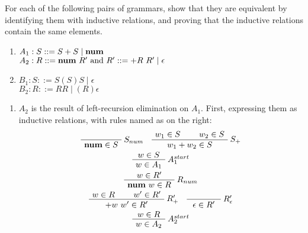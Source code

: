 
\begin{exercise}{}
  For each of the following pairs of grammars, show that they are equivalent by
  identifying them with inductive relations, and proving that the inductive
  relations contain the same elements.

  \begin{enumerate}
    \item 
    \(A_1 : S ::= S + S \mid \mathbf{num} \) \\ 
    \(A_2 : R ::= \mathbf{num} ~R' \text{ and } R' ::= + R~ R' \mid \epsilon\)
    \item 
    \(B_1 : S ::= S(S)S \mid \epsilon \) \\ 
    \(B_2 : R ::= RR \mid (R) \epsilon\)
  \end{enumerate}

  \begin{solution}
    \begin{enumerate}
      \item \(A_2\) is the result of left-recursion elimination on \(A_1\).
      First, expressing them as inductive relations, with rules named as on the
      right:
      \addtolength{\jot}{1ex}
      \begin{gather*}
        \AxiomC{\phantom{\(w_1 \in S\)}}
        \RightLabel{\(S_{num}\)}
        \UnaryInfC{\(\num \in S\)}
        \DisplayProof 
        \quad
        \AxiomC{\(w_1 \in S\)}
        \AxiomC{\(w_2 \in S\)}
        \RightLabel{\(S_+\)}
        \BinaryInfC{\(w_1 + w_2 \in S\)}
        \DisplayProof \\
        \AxiomC{\(w \in S\)}
        \RightLabel{\(A_{1}^{start}\)}
        \UnaryInfC{\(w \in A_1\)}
        \DisplayProof \\
        \AxiomC{\(w \in R'\)}
        \RightLabel{\(R_{num}\)}
        \UnaryInfC{\(\num~ w\in R\)}
        \DisplayProof \\
        \AxiomC{\(w \in R\)}
        \AxiomC{\(w' \in R'\)}
        \RightLabel{\(R'_{+}\)}
        \BinaryInfC{\(+w ~ w' \in R'\)}
        \DisplayProof 
        \quad
        \AxiomC{\phantom{\(w' \in R'\)}}
        \RightLabel{\(R'_{\epsilon}\)}
        \UnaryInfC{\(\epsilon \in R'\)}
        \DisplayProof \\
        \AxiomC{\(w \in R\)}
        \RightLabel{\(A_{2}^{start}\)}
        \UnaryInfC{\(w \in A_2\)}
        \DisplayProof
      \end{gather*}


\end{enumerate}
\end{solution}
\end{exercise}
